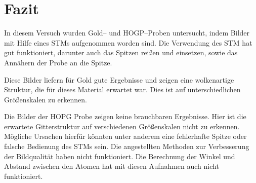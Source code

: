 \documentclass[sn-mathphys-num,iicol]{sn-jnl}
\theoremstyle{thmstyleone}
\theoremstyle{thmstyletwo}
\theoremstyle{thmstylethree}
\begin{document}
\section{Fazit}
In diesem Versuch wurden Gold-- und HOGP--Proben untersucht, indem Bilder mit Hilfe eines STMs aufgenommen worden sind.
Die Verwendung des STM hat gut funktioniert, darunter auch das Spitzen reißen und einsetzen, sowie das Annähern der Probe an die Spitze.

Diese Bilder liefern für Gold gute Ergebnisse und zeigen eine wolkenartige Struktur, die für dieses Material erwartet war.
Dies ist auf unterschiedlichen Größenskalen zu erkennen.

Die Bilder der HOPG Probe zeigen keine brauchbaren Ergebnisse.
Hier ist die erwartete Gitterstruktur auf verschiedenen Größenskalen nicht zu erkennen.
Mögliche Ursachen hierfür könnten unter anderem eine fehlerhafte Spitze oder falsche Bedienung des STMs sein.
Die angestellten Methoden zur Verbesserung der Bildqualität haben nicht funktioniert.
Die Berechnung der Winkel und Abstand zwischen den Atomen hat mit diesen Aufnahmen auch nicht funktioniert.



\clearpage
\end{document}
